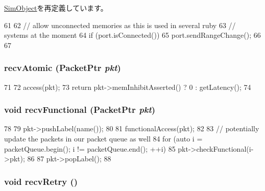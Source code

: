 \hyperlink{classSimObject_a02fd73d861ef2e4aabb38c0c9ff82947}{SimObject}を再定義しています。


\begin{DoxyCode}
61 {
62     // allow unconnected memories as this is used in several ruby
63     // systems at the moment
64     if (port.isConnected()) {
65         port.sendRangeChange();
66     }
67 }
\end{DoxyCode}
\hypertarget{classSimpleMemory_a5f0b4c4a94f6b0053f9d7a4eb9c2518a}{
\subsubsection[{recvAtomic}]{ recvAtomic ({\bf PacketPtr} {\em pkt})}}
\label{classSimpleMemory_a5f0b4c4a94f6b0053f9d7a4eb9c2518a}



\begin{DoxyCode}
71 {
72     access(pkt);
73     return pkt->memInhibitAsserted() ? 0 : getLatency();
74 }
\end{DoxyCode}
\hypertarget{classSimpleMemory_aeefa907fb6d6a787e6dab90e8138ea90}{
\subsubsection[{recvFunctional}]{\setlength{\rightskip}{0pt plus 5cm}void recvFunctional ({\bf PacketPtr} {\em pkt})}}
\label{classSimpleMemory_aeefa907fb6d6a787e6dab90e8138ea90}



\begin{DoxyCode}
78 {
79     pkt->pushLabel(name());
80 
81     functionalAccess(pkt);
82 
83     // potentially update the packets in our packet queue as well
84     for (auto i = packetQueue.begin(); i != packetQueue.end(); ++i)
85         pkt->checkFunctional(i->pkt);
86 
87     pkt->popLabel();
88 }
\end{DoxyCode}
\hypertarget{classSimpleMemory_a29cb5a4f98063ce6e9210eacbdb35298}{
\subsubsection[{recvRetry}]{\setlength{\rightskip}{0pt plus 5cm}void recvRetry ()}}
\label{classSimpleMemory_a29cb5a4f98063ce6e9210eacbdb35298}




